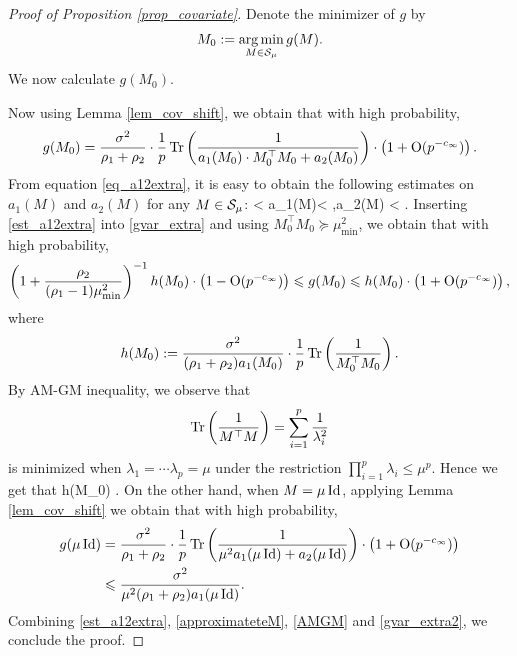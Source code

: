 \begin{proof}[Proof of Proposition \ref{prop_covariate}]
 

 
 Denote the minimizer of $g$ by 
$$M_0:=\argmin_{M\in \cal S_{\mu}}g(M).$$ 
We now calculate $g(M_0)$. 


Now using Lemma \ref{lem_cov_shift}, we obtain that with high probability,
\begin{align}\label{gvar_extra}
g(M_0)= \frac{\sigma^2}{\rho_1+\rho_2}\cdot \frac1p\tr\left( \frac{1}{a_1(M_0)\cdot M_0^\top M_0 + a_2(M_0)}\right) \cdot \left(1 +\OO(p^{-\e})\right).
\end{align}
From equation \eqref{eq_a12extra}, it is easy to obtain the following estimates on $ a_1(M)$ and $a_2(M)$ for any $M\in \cal S_\mu$:
\be\label{est_a12extra}
 < a_1(M)<  ,\quad a_2(M) < .
\ee
Inserting \eqref{est_a12extra} into \eqref{gvar_extra} and using $ M_0^\top M_0\succeq \mu_{\min}^2$, we obtain that with high probability,
\begin{align}\label{approximateteM}
\left(1+\frac{\rho_2}{(\rho_1-1)\mu_{\min}^2}\right)^{-1}h(M_0) \cdot \left(1 - \OO(p^{-\e})\right) \le g(M_0) \le h(M_0) \cdot \left(1 +\OO(p^{-\e})\right),
\end{align}
where
$$h(M_0):=\frac{\sigma^2}{(\rho_1+\rho_2)a_1(M_0)}\cdot \frac1p\tr\left( \frac{1}{M_0^\top M_0}\right) .$$
%
By AM-GM inequality, we observe that 
$$\tr\left( \frac{1}{M^\top M}\right) = \sum_{i=1}^p\frac{1}{\lambda_i^2}$$
is minimized when $\lambda_1 = \cdots\lambda_p=\mu$ under the restriction $\prod_{i=1}^p\lambda_i\le \mu^p$. Hence we get that 
\be\label{AMGM} h(M_0) \le {}.\ee
On the other hand, when $M=\mu \id$, applying Lemma \ref{lem_cov_shift} we obtain that with high probability,
\begin{align}\label{gvar_extra2}
\begin{split}
g(\mu \id)&= \frac{\sigma^2}{\rho_1+\rho_2}\cdot \frac1p\tr\left( \frac{1}{\mu^2 a_1 (\mu\id) + a_2(\mu\id)}\right) \cdot \left(1 +\OO(p^{-\e})\right)\\
&\le \frac{\sigma^2}{\mu^2(\rho_1+\rho_2)a_1 (\mu\id)}.
\end{split}
\end{align}
Combining \eqref{est_a12extra}, \eqref{approximateteM}, \eqref{AMGM} and \eqref{gvar_extra2}, we conclude the proof.
\end{proof}
\fi


